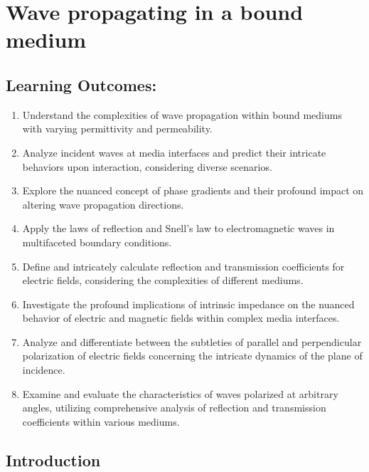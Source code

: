  \chapter{Wave propagating in a bound medium}\label{lec:lec30}

\section{Learning Outcomes:}
\begin{mdframed}[backgroundcolor=lightblue, linewidth=1pt, hidealllines=true]
    \begin{enumerate}[label=\roman*., itemsep=0pt, topsep=0pt]
        \item Understand the complexities of wave propagation within bound mediums with varying permittivity and permeability.
        \item Analyze incident waves at media interfaces and predict their intricate behaviors upon interaction, considering diverse scenarios.
        \item Explore the nuanced concept of phase gradients and their profound impact on altering wave propagation directions.
        \item Apply the laws of reflection and Snell's law to electromagnetic waves in multifaceted boundary conditions.
        \item Define and intricately calculate reflection and transmission coefficients for electric fields, considering the complexities of different mediums.
        \item Investigate the profound implications of intrinsic impedance on the nuanced behavior of electric and magnetic fields within complex media interfaces.
        \item Analyze and differentiate between the subtleties of parallel and perpendicular polarization of electric fields concerning the intricate dynamics of the plane of incidence.
        \item Examine and evaluate the characteristics of waves polarized at arbitrary angles, utilizing comprehensive analysis of reflection and transmission coefficients within various mediums.
    \end{enumerate}
\end{mdframed}

\section{Introduction}

